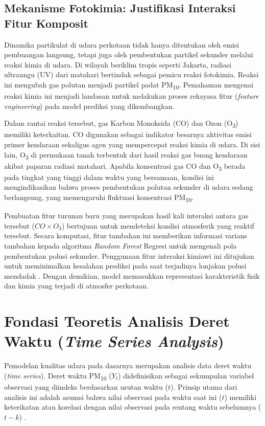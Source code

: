 \subsection{Mekanisme Fotokimia: Justifikasi Interaksi Fitur Komposit}

Dinamika partikulat di udara perkotaan tidak hanya ditentukan oleh emisi pembuangan langsung, tetapi juga oleh pembentukan partikel sekunder melalui reaksi kimia di udara. Di wilayah beriklim tropis seperti Jakarta, radiasi ultraungu (UV) dari matahari bertindak sebagai pemicu reaksi fotokimia. Reaksi ini mengubah gas polutan menjadi partikel padat PM\textsubscript{10}. Pemahaman mengenai reaksi kimia ini menjadi landasan untuk melakukan proses rekayasa fitur (\textit{feature engineering}) pada model prediksi yang dikembangkan.

Dalam rantai reaksi tersebut, gas Karbon Monoksida (CO) dan Ozon (O\textsubscript{3}) memiliki keterkaitan. CO digunakan sebagai indikator besarnya aktivitas emisi primer kendaraan sekaligus agen yang mempercepat reaksi kimia di udara. Di sisi lain, O\textsubscript{3} di permukaan tanah terbentuk dari hasil reaksi gas buang kendaraan akibat paparan radiasi matahari. Apabila konsentrasi gas CO dan O\textsubscript{3} berada pada tingkat yang tinggi dalam waktu yang bersamaan, kondisi ini mengindikasikan bahwa proses pembentukan polutan sekunder di udara sedang berlangsung, yang memengaruhi fluktuasi konsentrasi PM\textsubscript{10}.

Pembuatan fitur turunan baru yang merupakan hasil kali interaksi antara gas tersebut ($CO \times O_3$) bertujuan untuk mendeteksi kondisi atmosferik yang reaktif tersebut. Secara komputasi, fitur tambahan ini memberikan informasi varians tambahan kepada algoritma \textit{Random Forest} Regresi untuk mengenali pola pembentukan polusi sekunder. Penggunaan fitur interaksi kimiawi ini ditujukan untuk meminimalkan kesalahan prediksi pada saat terjadinya lonjakan polusi mendadak \autocite{naz2024two}. Dengan demikian, model memasukkan representasi karakteristik fisik dan kimia yang terjadi di atmosfer perkotaan.

\newpage

\section{Fondasi Teoretis Analisis Deret Waktu (\textit{Time Series Analysis})}

Pemodelan kualitas udara pada dasarnya merupakan analisis data deret waktu (\textit{time series}). Deret waktu PM\textsubscript{10} ($Y_t$) didefinisikan sebagai sekumpulan variabel observasi yang diindeks berdasarkan urutan waktu ($t$). Prinsip utama dari analisis ini adalah asumsi bahwa nilai observasi pada waktu saat ini ($t$) memiliki keterikatan atau korelasi dengan nilai observasi pada rentang waktu sebelumnya ($t-k$) \autocite{vasconcelos2025stationarity}.

